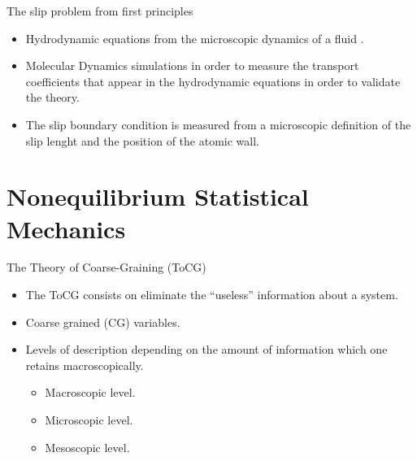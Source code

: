 \documentclass{beamer}
\begin{document}
\begin{frame}{The slip problem from first principles}
  \begin{itemize}
\item Hydrodynamic equations from the microscopic dynamics of a fluid \cite{Piccirelli1968}.
\item Molecular Dynamics simulations in order to measure the transport coefficients that appear in the hydrodynamic equations in order to validate the theory.
\item The slip boundary condition is measured from a microscopic definition of the slip lenght and the position of the atomic wall. 
\end{itemize}
\end{frame}

\section{Nonequilibrium Statistical Mechanics}
\begin{frame}{The Theory of Coarse-Graining (ToCG)}
\begin{itemize}
\item The ToCG consists on eliminate the ``useless'' information about a system. 
\item Coarse grained (CG) variables.
\item Levels of description depending on the amount of information which one retains macroscopically.
  \begin{itemize}
    \item Macroscopic level.
    \item Microscopic level.
    \item Mesoscopic level.
    \end{itemize}
\end{itemize}
\end{frame}
\end{document}
